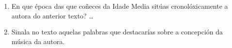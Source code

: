 %
\begin{ejercicio}
  \begin{enumerate}[1.-]
  \item
    En que época das que coñeces da Idade Media sitúas cronolóxicamente a autora do anterior texto? \ldots
  \item
    Sinala no texto aquelas palabras que destacarías sobre a concepción da música da autora. \\
    \vspace*{8.10cm}
  \end{enumerate}
\end{ejercicio}
